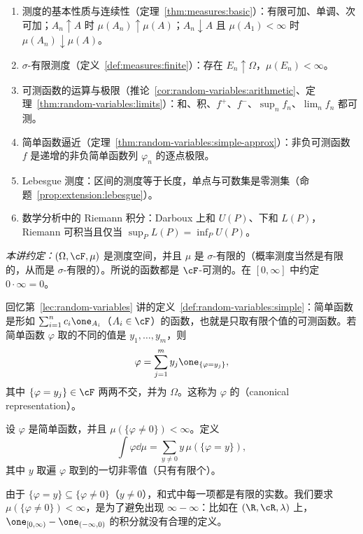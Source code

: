\begin{enumerate}
\item 测度的基本性质与连续性（定理~\ref{thm:measures:basic}）：有限可加、单调、次可加；$A_n\uparrow A$ 时 $\mu(A_n)\uparrow\mu(A)$；$A_n\downarrow A$ 且 $\mu(A_1)<\infty$ 时 $\mu(A_n)\downarrow\mu(A)$。
\item $\sigma$-有限测度（定义~\ref{def:measures:finite}）：存在 $E_n\uparrow\Omega$，$\mu(E_n)<\infty$。
\item 可测函数的运算与极限（推论~\ref{cor:random-variables:arithmetic}、定理~\ref{thm:random-variables:limits}）：和、积、$f^+$、$f^-$、$\sup_n f_n$、$\lim_nf_n$ 都可测。
\item 简单函数逼近（定理~\ref{thm:random-variables:simple-approx}）：非负可测函数 $f$ 是递增的非负简单函数列 $\varphi_n$ 的逐点极限。
\item Lebesgue 测度：区间的测度等于长度，单点与可数集是零测集（命题~\ref{prop:extension:lebesgue}）。
\item 数学分析中的 Riemann 积分：Darboux 上和 $U(P)$、下和 $L(P)$，Riemann 可积当且仅当 $\sup_PL(P)=\inf_PU(P)$。
\end{enumerate}

\emph{本讲约定：}$(\Omega,\cF,\mu)$ 是测度空间，并且 $\mu$ 是 $\sigma$-有限的（概率测度当然是有限的，从而是 $\sigma$-有限的）。所说的函数都是 $\cF$-可测的。在 $[0,\infty]$ 中约定 $0\cdot\infty=0$。


回忆第~\ref{lec:random-variables} 讲的定义~\ref{def:random-variables:simple}：简单函数是形如 $\sum_{i=1}^nc_i\one_{A_i}$（$A_i\in\cF$）的函数，也就是只取有限个值的可测函数。若简单函数 $\varphi$ 取的不同的值是 $y_1,\dots,y_m$，则
\[
\varphi=\sum_{j=1}^my_j\one_{\{\varphi=y_j\}},
\]
其中 $\{\varphi=y_j\}\in\cF$ 两两不交，并为 $\Omega$。这称为 $\varphi$ 的（canonical representation）。

\begin{definition}[简单函数的积分]\label{def:integration:simple}
设 $\varphi$ 是简单函数，并且 $\mu(\{\varphi\neq0\})<\infty$。定义
\[
\int\varphi\dd\mu=\sum_{y\neq0}y\,\mu(\{\varphi=y\}),
\]
其中 $y$ 取遍 $\varphi$ 取到的一切非零值（只有有限个）。
\end{definition}

由于 $\{\varphi=y\}\subseteq\{\varphi\neq0\}$（$y\neq0$），和式中每一项都是有限的实数。我们要求 $\mu(\{\varphi\neq0\})<\infty$，是为了避免出现 $\infty-\infty$：比如在 $(\R,\cR,\lambda)$ 上，$\one_{[0,\infty)}-\one_{(-\infty,0)}$ 的积分就没有合理的定义。

